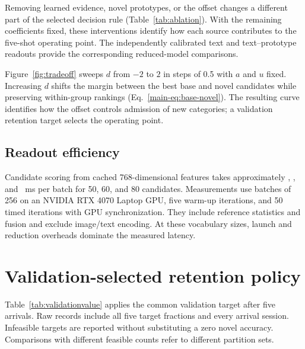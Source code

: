 \documentclass[preprint,review,12pt]{elsarticle}
\begin{document}
Removing learned evidence, novel prototypes, or the offset changes a different part of the selected decision rule (Table~\ref{tab:ablation}). With the remaining coefficients fixed, these interventions identify how each source contributes to the five-shot operating point. The independently calibrated text and text--prototype readouts provide the corresponding reduced-model comparisons.

Figure~\ref{fig:tradeoff} sweeps $d$ from $-2$ to $2$ in steps of 0.5 with $a$ and $u$ fixed. Increasing $d$ shifts the margin between the best base and novel candidates while preserving within-group rankings (Eq.~\eqref{main-eq:base-novel}). The resulting curve identifies how the offset controls admission of new categories; a validation retention target selects the operating point.

\subsection{Readout efficiency}
Candidate scoring from cached 768-dimensional features takes approximately \LatencyFifty, \LatencySixty, and \LatencyEighty\ ms per batch for 50, 60, and 80 candidates. Measurements use batches of 256 on an NVIDIA RTX 4070 Laptop GPU, five warm-up iterations, and 50 timed iterations with GPU synchronization. They include reference statistics and fusion and exclude image/text encoding. At these vocabulary sizes, launch and reduction overheads dominate the measured latency.


\FloatBarrier
\section{Validation-selected retention policy}
\label{app:validationpolicy}
\begin{table}[t]
\centering
\caption{Final-session test accuracies after the admission threshold is selected using base validation only. Budgets use the same closed-base validation reference for all methods within a partition. Values are percentages, mean $\pm$ sample standard deviation over feasible partitions; counts identify those partitions. Test accuracies are the outcomes of this operational policy and are not matched by test labels.}
\label{tab:validationvalue}
\resizebox{\linewidth}{!}{}
\end{table}
Table~\ref{tab:validationvalue} applies the common validation target after five arrivals. Raw records include all five target fractions and every arrival session. Infeasible targets are reported without substituting a zero novel accuracy. Comparisons with different feasible counts refer to different partition sets.
\FloatBarrier
\end{document}
